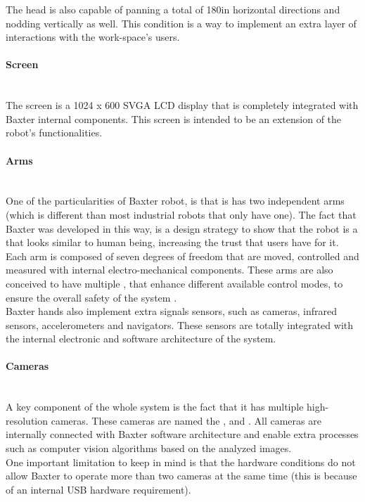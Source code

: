 \documentclass[11pt]{report} %
\newcommand{\subsubsubsection}[1]{\paragraph{#1}\mbox{}\\}
\begin{document}
The head is also capable of panning a total of 180\textdegree \space in horizontal directions and nodding vertically as well. This condition is a way to implement an extra layer of interactions with the work-space's users.\\

\subsubsubsection{Screen}

The screen is a 1024 x 600 SVGA LCD display that is completely integrated with Baxter internal components. This screen is intended to be an extension of the robot's functionalities.\\

\subsubsubsection{Arms}

One of the particularities of Baxter robot, is that is has two independent arms (which is different than most industrial robots that only have one). The fact that Baxter was developed in this way, is a design strategy to show that the robot is a  that looks similar to human being, increasing the trust that users have for it.\\

Each arm is composed of seven degrees of freedom that are moved, controlled and measured with internal electro-mechanical components. These arms are also conceived to have multiple , that enhance different available control modes, to ensure the overall safety of the system \citep{cite_baxter_arms_wiki}.\\

Baxter hands also implement extra signals sensors, such as cameras, infrared sensors, accelerometers and navigators. These sensors are totally integrated with the internal electronic and software architecture of the system.\\


\subsubsubsection{Cameras}

A key component of the whole system is the fact that it has multiple high-resolution cameras. These cameras are named the ,  and . All cameras are internally connected with Baxter software architecture and enable extra processes such as computer vision algorithms based on the analyzed images.\\

One important limitation to keep in mind is that the hardware conditions do not allow Baxter to operate more than two cameras at the same time (this is because of an internal USB hardware requirement).\\
\end{document}
